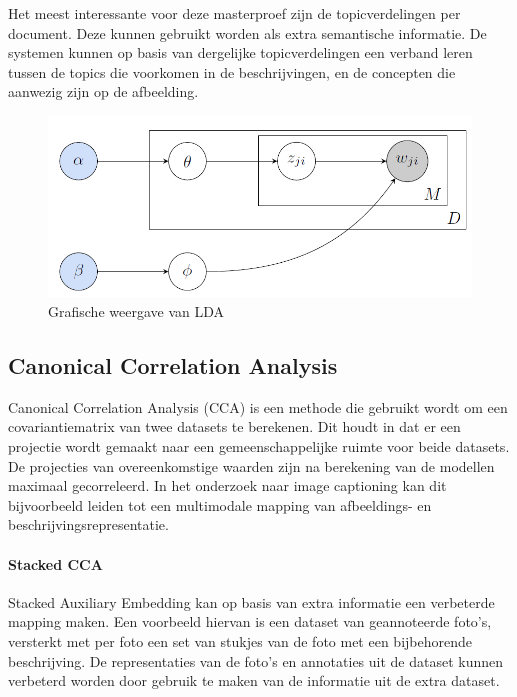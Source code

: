 Het meest interessante voor deze masterproef zijn de topicverdelingen per document. Deze kunnen gebruikt worden als extra semantische informatie. De systemen kunnen op basis van dergelijke topicverdelingen een verband leren tussen de topics die voorkomen in de beschrijvingen, en de concepten die aanwezig zijn op de afbeelding. 
\begin{figure}[tb]
    \centering
    \includegraphics[width=\linewidth]{Images/lda.png}
    \caption{Grafische weergave van LDA}
    \label{fig:lda}
\end{figure}


\subsection{Canonical Correlation Analysis}
\label{sub:stackedcca}
Canonical Correlation Analysis (CCA) is een methode die gebruikt wordt om een covariantiematrix van twee datasets te berekenen. Dit houdt in dat er een projectie wordt gemaakt naar een gemeenschappelijke ruimte voor beide datasets. De projecties van overeenkomstige waarden zijn na berekening van de modellen maximaal gecorreleerd. In het onderzoek naar image captioning kan dit bijvoorbeeld leiden tot een multimodale mapping van afbeeldings- en beschrijvingsrepresentatie.
 

\paragraph{Stacked CCA}

Stacked Auxiliary Embedding\cite{Gong2014} kan op basis van extra informatie een verbeterde mapping maken. Een voorbeeld hiervan is een dataset van geannoteerde foto's, versterkt met per foto een set van stukjes van de foto met een bijbehorende beschrijving. De representaties van de foto's en annotaties uit de dataset kunnen verbeterd worden door gebruik te maken van de informatie uit de extra dataset.

